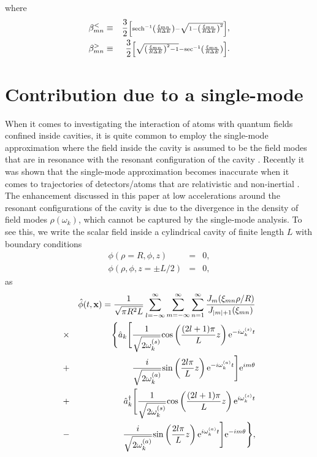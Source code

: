\documentclass[aps,prl,nofootinbib,preprintnumbers,floatfix,twocolumn,superscriptaddress]{revtex4}
\def\nn{\nonumber}
\def\nn{\nonumber}
\def\l{\left}
\def\r{\right}
\def\f{\frac}
\def\e{{\rm e}}
\def\x{{\bf x}}
\begin{document}
where 
\begin{eqnarray}
 \beta_{mn}^{<} &\equiv& \f{3}{2} {\scriptstyle 
 \left[{\rm sech}^{-1}\l(\f{\xi_{mn}}{R\Delta E}\r)
 -\sqrt{1-\l(\f{\xi_{mn}}{R\Delta E}\r)^2}\right]}, \nn  \\ 
 \beta_{mn}^{>} &\equiv& \f{3}{2} {\scriptstyle \left[\sqrt{\l(\f{\xi_{mn}}{R\Delta E}\r)^2-1}
 -{\rm sec}^{-1}\l(\f{\xi_{mn}}{R\Delta E}\r)\right]}. \nn
\end{eqnarray}
\section{Contribution due to a single-mode}
When it comes to investigating the interaction of atoms with quantum fields confined inside 
cavities, it is quite common to employ the 
single-mode approximation where the field inside the cavity is assumed to be the 
field modes that are in resonance with the resonant configuration of the cavity 
\cite{Deb-1997, Prants-1999, Scully-2003, Mann-2011, Lopp-2018}. 
Recently it was shown that the single-mode approximation becomes inaccurate when it comes to 
trajectories of detectors/atoms that are relativistic and non-inertial \cite{Lopp-2018}. 
The enhancement discussed in this paper at low accelerations around the resonant configurations 
of the cavity is due to the divergence in the density of field modes $\rho(\omega_{k})$, which 
cannot be captured by the single-mode analysis. 
To see this, we write the scalar field inside a cylindrical cavity of finite length 
$L$ with boundary conditions 
\begin{eqnarray}
 \phi(\rho=R,\phi,z)&=&0, \\
 \phi(\rho,\phi,z=\pm L/2)&=&0,
\end{eqnarray}
as 
\begin{eqnarray}
 &&{\hat \phi}(t,\x)=\f{1}{\sqrt{\pi R^2 L}} 
 \sum_{l=-\infty}^{\infty} \sum_{m=-\infty}^{\infty}\sum_{n=1}^{\infty} 
 \f{J_{m}(\xi_{mn} \rho/R)}{J_{|m|+1}(\xi_{mn})} \nn \\ 
 &\times& \Biggl\{{\hat a}_{k} 
 \Biggl[\f{1}{\sqrt{2\omega^{(s)}_{k}}} {\rm cos}\l(\f{(2l+1)\pi}{L}z\r) \e^{-i\omega^{(s)}_k t} \nn \\  
 &+&\f{i}{\sqrt{2\omega^{(a)}_{k}}} {\rm sin}\l(\f{2l\pi}{L}z\r) 
 \e^{-i\omega^{(a)}_k t}\Biggr]  \e^{im\theta} \nn \\ 
 &+&{\hat a}^{\dagger}_{k} 
 \Biggl[\f{1}{\sqrt{2\omega^{(s)}_{k}}} {\rm cos}\l(\f{(2l+1)\pi}{L}z\r) 
 \e^{i\omega^{(s)}_k t} \nn \\ 
 &-&\f{i}{\sqrt{2\omega^{(a)}_{k}}} {\rm sin}\l(\f{2l\pi}{L}z\r) 
 \e^{i\omega^{(a)}_k t}\Biggr] \e^{-im\theta}\Biggr\}, 
\end{eqnarray}
\end{document}
